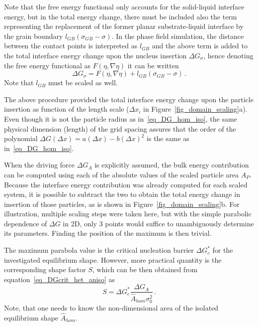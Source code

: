 Note that the free energy functional only accounts for the solid-liquid interface energy, but in the total energy change, there must be included also the term representing the replacement of the former planar substrate-liquid interface by the grain boundary $l_{GB}(\sigma_{GB}-\sigma)$. In the phase field simulation, the distance between the contact points is interpreted as $l_{GB}$ and the above term is added to the total interface energy change upon the nucleus insertion $\Delta G_\sigma$, hence denoting the free energy functional as $F(\eta,\nabla\eta)$ it can be written
\begin{equation}
	\Delta G_\sigma = F(\eta,\nabla\eta) + l_{GB}(\sigma_{GB}-\sigma) \,.
\end{equation}
Note that $l_{GB}$ must be scaled as well.

The above procedure provided the total interface energy change upon the particle insertion as function of the length scale ($\Delta x_i$ in Figure~\ref{fig_domain_scaling}a). Even though it is not the particle radius as in~\eqref{eq_DG_hom_iso}, the same physical dimension (length) of the grid spacing assures that the order of the polynomial $\Delta G(\Delta x) = a(\Delta x) - b(\Delta x)^2$ is the same as in~\eqref{eq_DG_hom_iso}.

When the driving force $\Delta G_A$ is explicitly assumed, the bulk energy contribution can be computed using each of the absolute values of the scaled particle area $A_P$. Because the interface energy contribution was already computed for each scaled system, it is possible to subtract the two to obtain the total energy change in insertion of those particles, as is shown in Figure~\ref{fig_domain_scaling}b. For illustration, multiple scaling steps were taken here, but with the simple parabolic dependence of $\Delta G$ in 2D, only 3 points would suffice to unambiguously determine its parameters. Finding the position of the maximum is then trivial. 

The maximum parabola value is the critical nucleation barrier $\Delta G_c^*$ for the investigated equilibrium shape. However, more practical quantity is the corresponding shape factor $S$, which can be then obtained from equation~\eqref{eq_DGcrit_het_aniso} as
\begin{equation} \label{eq_NPA_PF_formula}
	S = \Delta G_c^*\frac{\Delta G_A}{\hat{A}_{hom}\sigma_0^2} \,.
\end{equation}
Note, that one needs to know the non-dimensional area of the isolated equilibrium shape $\hat{A}_{hom}$.

